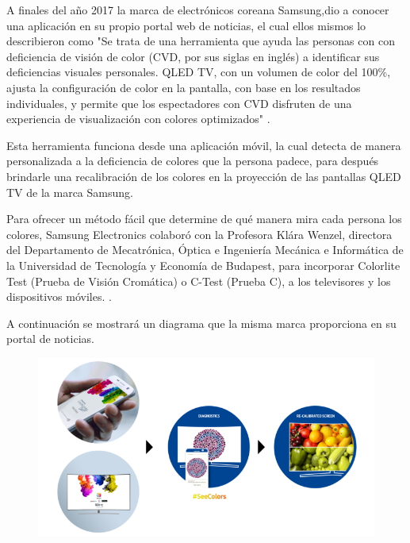 \documentclass[10pt]{article}
\begin{document}
A finales del año 2017 la marca de electrónicos coreana Samsung\textregistered,\space dio a conocer una aplicación en su propio portal web de noticias, el cual ellos mismos lo describieron como "Se trata de una herramienta que ayuda las personas con con deficiencia de visión de color (CVD, por sus siglas en inglés) a identificar sus deficiencias visuales personales. QLED TV, con un volumen de color del 100\%, ajusta la configuración de color en la pantalla, con base en los resultados individuales, y permite que los espectadores con CVD disfruten de una experiencia de visualización con colores optimizados" \cite{IEEEreferencias:Ref19}. \newline

\setlength{\parskip}{2mm}

Esta herramienta funciona desde una aplicación móvil, la cual detecta de manera personalizada a la deficiencia de colores que la persona padece, para después brindarle una recalibración de los colores en la proyección de las pantallas QLED TV de la marca Samsung\textregistered \cite{IEEEreferencias:Ref19}. \newline

\setlength{\parskip}{2mm}

Para ofrecer un método fácil que determine de qué manera mira cada persona los colores, Samsung Electronics colaboró con la Profesora Klára Wenzel, directora del Departamento de Mecatrónica, Óptica e Ingeniería Mecánica e Informática de la Universidad de Tecnología y Economía de Budapest, para incorporar Colorlite Test (Prueba de Visión Cromática) o C-Test (Prueba C), a los televisores y los dispositivos móviles.
\cite{IEEEreferencias:Ref19}.

\setlength{\parskip}{2mm}

A continuación se mostrará un diagrama que la misma marca proporciona en su portal de noticias. \newline

\begin{figure}[H]
	\begin{center}
\includegraphics[scale = 2.30]{Imagenes/Samsung-SeeColors-App-for-QLED-TV_main_2.jpg}
	\end{center} 
\end{figure}
\end{document}
